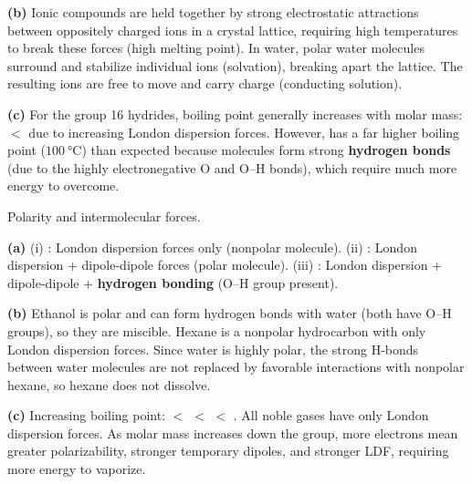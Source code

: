 \documentclass[addpoints]{exam}
\begin{document}
\begin{questions}
\begin{solution}[9cm]
\textbf{(b)} Ionic compounds are held together by strong electrostatic attractions between
oppositely charged ions in a crystal lattice, requiring high temperatures to break these
forces (high melting point). In water, polar water molecules surround and stabilize individual
ions (solvation), breaking apart the lattice. The resulting ions are free to move and carry
charge (conducting solution).

\textbf{(c)} For the group 16 hydrides, boiling point generally increases with molar mass:
 $< $  due to increasing London dispersion forces. However,  has a
far higher boiling point ($\SI{100}{\celsius}$) than expected because  molecules form
strong \textbf{hydrogen bonds} (due to the highly electronegative O and O--H bonds), which
require much more energy to overcome.
\end{solution}

\question Polarity and intermolecular forces.
\begin{solution}[9cm]
\textbf{(a)}
(i) : London dispersion forces only (nonpolar molecule).
(ii) : London dispersion + dipole-dipole forces (polar molecule).
(iii) : London dispersion + dipole-dipole + \textbf{hydrogen bonding}
(O--H group present).

\textbf{(b)} Ethanol is polar and can form hydrogen bonds with water (both have O--H groups),
so they are miscible. Hexane is a nonpolar hydrocarbon with only London dispersion forces.
Since water is highly polar, the strong H-bonds between water molecules are not replaced by
favorable interactions with nonpolar hexane, so hexane does not dissolve.

\textbf{(c)} Increasing boiling point:  $<$  $<$  $<$ .
All noble gases have only London dispersion forces. As molar mass increases down the group,
more electrons mean greater polarizability, stronger temporary dipoles, and stronger LDF,
requiring more energy to vaporize.
\end{solution}

\end{questions}
\end{document}
